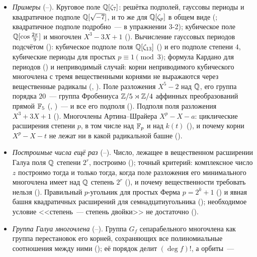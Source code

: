 \begin{itemize}[leftmargin=*]
условие <<расширение Галуа>> (). Композиты и пересечения, нормальное замыкание на языке подгрупп (, );
поднятие расширения Галуа на композит (, ) и степень композита (; без условия Галуа~--- лишь неравенство, ); группа Галуа композита двух расширений
Галуа как расслоённое произведение групп (), прямое произведение при $E_1\cap E_2=F$ () и связь с
кодекартовыми квадратами полей (; ср.\ --), второе доказательство  и склейки поля Галуа с самим собой ().
\item \emph{Примеры} (--). Круговое поле $\mathbb Q[\zeta_7]$: решётка подполей, гауссовы периоды и квадратичное
подполе $\mathbb Q[\sqrt{-7}]$, и то же для $\mathbb Q[\zeta_p]$ в общем виде (; квадратичное подполе подробно~--- в упражнении
3-2); кубическое поле $\mathbb Q[\cos\frac{2\pi}9]$ и многочлен $X^3-3X+1$ (). Вычисление гауссовых периодов подсчётом
(): кубическое подполе поля $\mathbb Q[\zeta_{13}]$ () и его подполе степени $4$, кубические периоды для простых
$p\equiv1\pmod3$; формула Кардано для периодов () и неприводимый
случай: корни неприводимого кубического многочлена с тремя вещественными корнями не выражаются через вещественные
радикалы (, ). Поле разложения $X^5-2$ над $\mathbb Q$, его группа порядка $20$~--- группа Фробениуса
$\mathbb Z/5\rtimes\mathbb Z/4$ аффинных преобразований прямой $\mathbb F_5$ (, )~--- и все его подполя (). Подполя поля
разложения $X^3+3X+1$ (). Многочлены Артина--Шрайера $X^p-X-a$: циклические расширения степени $p$, в том
числе над $\mathbb F_p$ и над $k(t)$ (), и почему корни $X^p-X-t$ не лежат ни в какой радикальной башне ().
\item \emph{Построимые числа ещё раз} (--). Число, лежащее в вещественном расширении Галуа поля $\mathbb Q$
степени $2^r$, построимо (); точный критерий: комплексное число $z$ построимо тогда и только тогда, когда поле
разложения его минимального многочлена имеет над $\mathbb Q$ степень $2^r$ (), и почему вещественности требовать
нельзя (). Правильный $p$-угольник для простых Ферма $p=2^k+1$ () и явная башня квадратичных расширений
для семнадцатиугольника (); необходимое условие <<степень~--- степень двойки>> не достаточно ().
\item \emph{Группа Галуа многочлена} (--). Группа $G_f$ сепарабельного многочлена как группа перестановок
его корней, сохраняющих все полиномиальные соотношения между ними (); её порядок делит $(\deg f)!$, а орбиты~---

\end{itemize}
